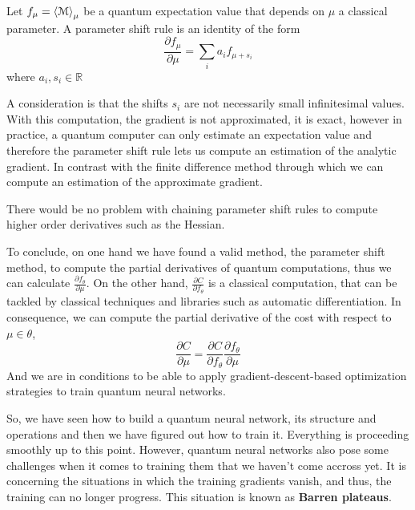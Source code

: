 \begin{enumerate}
    \begin{definicion} 
        Let $f_\mu = \braket{\mathcal{M}}_{\mu}$ be a quantum expectation value that depends on $\mu$ a classical parameter. A parameter shift rule is an identity of the form
        \begin{equation}
            \frac{\partial f_{\mu}}{\partial \mu} = \sum_{i} a_i f_{\mu + s_i}
        \end{equation}
        where $a_i, s_i \in \mathbb{R}$
    \end{definicion}

    A consideration is that the shifts $s_i$ are not necessarily small infinitesimal values. With this computation, the gradient is not approximated, it is exact, however in practice, a quantum computer can only estimate an expectation value and therefore the parameter shift rule lets us compute an estimation of the analytic gradient. In contrast with the finite difference method through which we can compute an estimation of the approximate gradient. 

    There would be no problem with chaining parameter shift rules to compute higher order derivatives such as the Hessian. 
    
\end{enumerate}

To conclude, on one hand we have found a valid method, the parameter shift method, to compute the partial derivatives of quantum computations, thus we can calculate $\frac{\partial f_{\theta}}{\partial \mu}$. On the other hand, $\frac{\partial C}{\partial f_{\theta}}$ is a classical computation, that can be tackled by classical techniques and libraries such as automatic differentiation. In consequence, we can compute the partial derivative of the cost with respect to $\mu \in \theta$, 
\begin{equation}
    \frac{\partial C}{\partial \mu} = \frac{\partial C}{\partial f_{\theta}} \frac{\partial f_{\theta}}{\partial \mu}
\end{equation}
And we are in conditions to be able to apply gradient-descent-based optimization strategies to train quantum neural networks.

So, we have seen how to build a quantum neural network, its structure and operations and then we have figured out how to train it. Everything is proceeding smoothly up to this point. However, quantum neural networks also pose some challenges when it comes to training them that we haven't come accross yet. It is concerning the situations in which the training gradients vanish, and thus, the training can no longer progress. This situation is known as \textbf{Barren plateaus}. 

